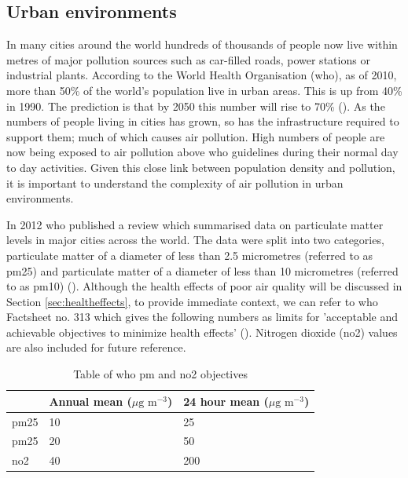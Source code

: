 
\subsection{Urban environments}
\label{subsec:urbanenvironments}
In many cities around the world hundreds of thousands of people now live within metres of major pollution sources such as car-filled roads, power stations or industrial plants. According to the World Health Organisation (\gls{who}), as of 2010, more than 50\% of the world’s population live in urban areas. This is up from 40\% in 1990. The prediction is that by 2050 this number will rise to 70\% (\cite{GlobalHealthObservatory2012}). As the numbers of people living in cities has grown, so has the infrastructure required to support them; much of which causes air pollution. High numbers of people are now being exposed to air pollution above \gls{who} guidelines during their normal day to day activities. Given this close link between population density and pollution, it is important to understand the complexity of air pollution in urban environments.

In 2012 \gls{who} published a review which summarised data on particulate matter levels in major cities across the world. The data were split into two categories, particulate matter of a diameter of less than 2.5 micrometres (referred to as \gls{pm25}) and particulate matter of a diameter of less than 10 micrometres (referred  to as \gls{pm10})  (\cite{WorldHealthOrganization2012}). Although the health effects of poor air quality will be discussed in Section \ref{sec:healtheffects}, to provide immediate context, we can refer to \gls{who} Factsheet no. 313 which gives the following numbers as limits for 'acceptable and achievable objectives to minimize health effects' (\cite{WorldHealthOrganization2011}). Nitrogen dioxide (\gls{no2}) values are also included for future reference.

\begin{table}[H]
\caption{Table of \gls{who} \gls{pm} and \gls{no2} objectives}
\centering
    \begin{tabular}{ | l | l | l |}
    \hline 
     & Annual mean ($\mu \text{g m}^{-3}$) & 24 hour mean ($\mu \text{g m}^{-3}$) \\ \hline
     \gls{pm25} & 10 & 25\\ \hline
     \gls{pm25} & 20 & 50\\ \hline
     \gls{no2} & 40 & 200\\ \hline
    \end{tabular}
\label{tab:whopmlevels}
\end{table}

